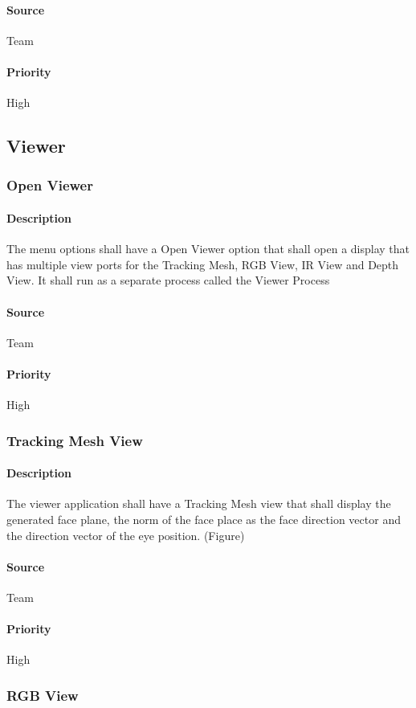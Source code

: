 \paragraph{Source}
Team
\paragraph{Priority}
High
\subsection{Viewer}
\subsubsection{Open Viewer}
\paragraph{Description}
The menu options shall have a Open Viewer option that shall open a display that has multiple view ports for the Tracking Mesh, RGB View, IR View and Depth View.  It shall run as a separate process called the Viewer Process
\paragraph{Source}
Team
\paragraph{Priority}
High
\subsubsection{Tracking Mesh View}
\paragraph{Description}
The viewer application shall have a Tracking Mesh view that shall display the generated face plane, the norm of the face place as the face direction vector and the direction vector of the eye position. (Figure)
\paragraph{Source}
Team
\paragraph{Priority}
High
\subsubsection{RGB View}
